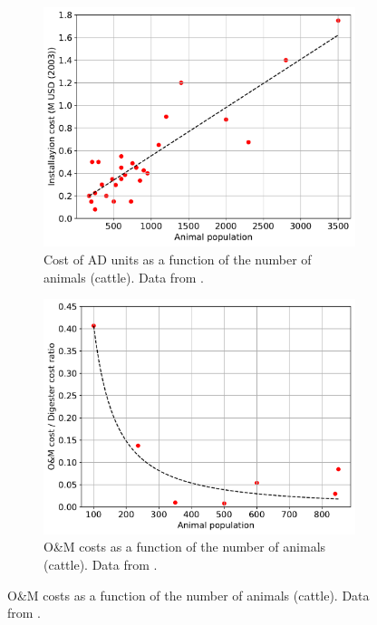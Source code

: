 \begin{refsection}[referencesCh4]
\begin{figure}[h!]
	\centering
	\begin{subfigure}[t]{0.7\textwidth}
		\includegraphics[width=\textwidth, trim={0cm 0cm 0cm 0cm},clip]{gfx/AppendixC/AD_size_cost}
		\caption{Cost of AD units as a function of the number of animals (cattle). Data from \citet{AgSTAR2003}.}
		\label{fig:AD_size_cost_AppC}
	\end{subfigure}
	\bigskip
	\begin{subfigure}[t]{0.75\textwidth}
		\includegraphics[width=\textwidth]{gfx/AppendixC/AD_size_OM_Unit_cost} 
		\caption{O\&M costs as a function of the number of animals (cattle). Data from \citet{USDA_OM}.}
		\label{fig:AD_size_OM_Unit_cost_AppC}
	\end{subfigure}
	

\end{figure}
\end{refsection}
